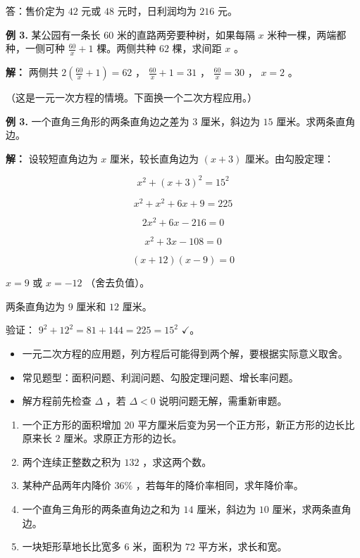 \begin{workedexamples}
答：售价定为 $42$ 元或 $48$ 元时，日利润均为 $216$ 元。

\textbf{例 3.} 某公园有一条长 $60$ 米的直路两旁要种树，如果每隔 $x$ 米种一棵，两端都种，一侧可种 $\frac{60}{x} + 1$ 棵。两侧共种 $62$ 棵，求间距 $x$ 。

\textbf{解：} 两侧共 $2\left(\frac{60}{x} + 1\right) = 62$ ， $\frac{60}{x} + 1 = 31$ ， $\frac{60}{x} = 30$ ， $x = 2$ 。

（这是一元一次方程的情境。下面换一个二次方程应用。）

\textbf{例 3.} 一个直角三角形的两条直角边之差为 $3$ 厘米，斜边为 $15$ 厘米。求两条直角边。

\textbf{解：} 设较短直角边为 $x$ 厘米，较长直角边为 $(x + 3)$ 厘米。由勾股定理：

\[
x^2 + (x + 3)^2 = 15^2
\]


\[
x^2 + x^2 + 6x + 9 = 225
\]


\[
2x^2 + 6x - 216 = 0
\]


\[
x^2 + 3x - 108 = 0
\]


\[
(x + 12)(x - 9) = 0
\]


$x = 9$ 或 $x = -12$ （舍去负值）。

两条直角边为 $9$ 厘米和 $12$ 厘米。

验证： $9^2 + 12^2 = 81 + 144 = 225 = 15^2$ $\checkmark$。

\end{workedexamples}

\begin{keytakeaway}


\begin{itemize}
  \item 一元二次方程的应用题，列方程后可能得到两个解，要根据实际意义取舍。
  \item 常见题型：面积问题、利润问题、勾股定理问题、增长率问题。
  \item 解方程前先检查 $\Delta$ ，若 $\Delta < 0$ 说明问题无解，需重新审题。
\end{itemize}


\end{keytakeaway}

\begin{practice}


\begin{enumerate}
  \item 一个正方形的面积增加 $20$ 平方厘米后变为另一个正方形，新正方形的边长比原来长 $2$ 厘米。求原正方形的边长。
  \item 两个连续正整数之积为 $132$ ，求这两个数。
  \item 某种产品两年内降价 $36\%$ ，若每年的降价率相同，求年降价率。
  \item 一个直角三角形的两条直角边之和为 $14$ 厘米，斜边为 $10$ 厘米，求两条直角边。
  \item 一块矩形草地长比宽多 $6$ 米，面积为 $72$ 平方米，求长和宽。
\end{enumerate}


\end{practice}



